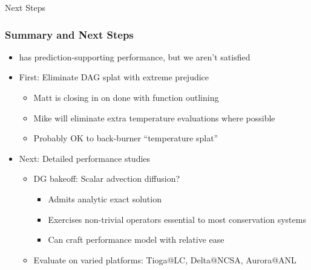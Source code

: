 \begin{frame}
    \centering
    \Large
    Next Steps
\end{frame}

\begin{frame}\frametitle{Summary and Next Steps}
\begin{itemize}
\item \mirgecom{} has prediction-supporting performance, but we aren't satisfied
\item First: Eliminate DAG splat with extreme prejudice
\begin{itemize}
\item Matt is closing in on done with function outlining
\item Mike will eliminate extra temperature evaluations where possible
\item Probably OK to back-burner ``temperature splat''
\end{itemize}
\item Next: Detailed performance studies
\begin{itemize}
\item DG bakeoff: Scalar advection diffusion?
\begin{itemize}
\item Admits analytic exact solution
\item Exercises non-trivial operators essential to most conservation systems
\item Can craft performance model with relative ease
\end{itemize}
\item Evaluate on varied platforms: Tioga@LC, Delta@NCSA, Aurora@ANL
\end{itemize}
\end{itemize}
\end{frame}

%

